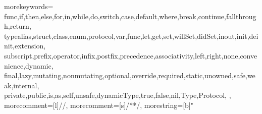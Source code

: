 %
\newcommand{\inputfiledox}[5]
{
  \begin{minipage}[t]{0.70\textwidth-0pt}
    {\noindent \bfseries \sffamily \large #1\\}
    {\noindent \small #2\\}
    \end{minipage}
    \hfill
    \begin{minipage}[t]{0.28\textwidth-0pt}
    \begin{flushright}
    \noindent \sffamily \color{dark-gray} \Huge #4
    \end{flushright}
  \end{minipage}

  \ifx&#2&%
  \vspace{-20pt}
  \else
  \vspace{-5pt}
  \fi

  \hrule
  
  [language={#5},
  morecomment={[s][\color{doxy-color}\bfseries]{/**}{*/}},
  morecomment={[l][\color{doxy-color}\bfseries]{//!}},
  morecomment={[l][\color{doxy-color}\bfseries]{///}}]
  {#3}
}

{
  morekeywords={
    func,if,then,else,for,in,while,do,switch,case,default,where,break,continue,fallthrough,return,
    typealias,struct,class,enum,protocol,var,func,let,get,set,willSet,didSet,inout,init,deinit,extension,
    subscript,prefix,operator,infix,postfix,precedence,associativity,left,right,none,convenience,dynamic,
    final,lazy,mutating,nonmutating,optional,override,required,static,unowned,safe,weak,internal,
    private,public,is,as,self,unsafe,dynamicType,true,false,nil,Type,Protocol,
  },
  morecomment=[l]{//}, %
  morecomment=[s]{/*}{*/}, %
  morestring=[b]" %
}
